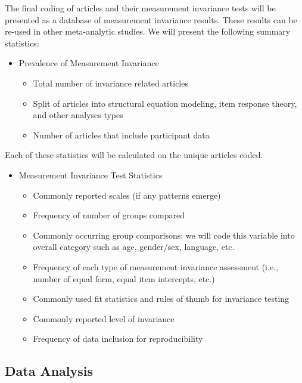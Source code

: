 \documentclass[
  man]{apa7}
\providecommand{\tightlist}{%
  \setlength{\itemsep}{0pt}\setlength{\parskip}{0pt}}
\begin{document}
The final coding of articles and their measurement invariance tests will be presented as a database of measurement invariance results. These results can be re-used in other meta-analytic studies. We will present the following summary statistics:

\begin{itemize}
\tightlist
\item
  Prevalence of Measurement Invariance

  \begin{itemize}
  \tightlist
  \item
    Total number of invariance related articles
  \item
    Split of articles into structural equation modeling, item response theory, and other analyses types
  \item
    Number of articles that include participant data
  \end{itemize}
\end{itemize}

Each of these statistics will be calculated on the unique articles coded.

\begin{itemize}
\tightlist
\item
  Measurement Invariance Test Statistics

  \begin{itemize}
  \tightlist
  \item
    Commonly reported scales (if any patterns emerge)
  \item
    Frequency of number of groups compared
  \item
    Commonly occurring group comparisons: we will code this variable into overall category such as age, gender/sex, language, etc.
  \item
    Frequency of each type of measurement invariance assessment (i.e., number of equal form, equal item intercepts, etc.)
  \item
    Commonly used fit statistics and rules of thumb for invariance testing
  \item
    Commonly reported level of invariance
  \item
    Frequency of data inclusion for reproducibility
  \end{itemize}
\end{itemize}

\hypertarget{data-analysis}{%
\subsection{Data Analysis}\label{data-analysis}}
\end{document}
